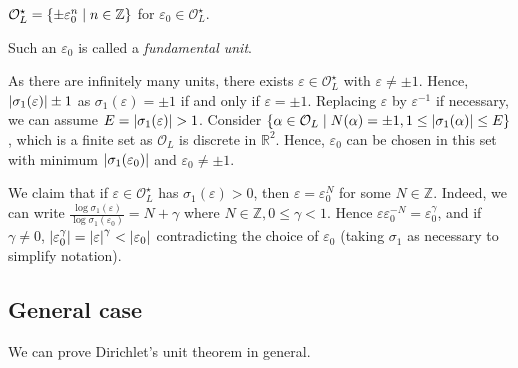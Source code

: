 \begin{corollary}
    \( \mathcal O_L^\star = \qty{\pm \varepsilon_0^n \mid n \in \mathbb Z} \) for \( \varepsilon_0 \in \mathcal O_L^\star \).
\end{corollary}
Such an \( \varepsilon_0 \) is called a \emph{fundamental unit}.
\begin{remark}
    As there are infinitely many units, there exists \( \varepsilon \in \mathcal O_L^\star \) with \( \varepsilon \neq \pm 1 \).
    Hence, \( \abs{\sigma_1(\varepsilon)} \pm 1 \) as \( \sigma_1(\varepsilon) = \pm 1 \) if and only if \( \varepsilon = \pm 1 \).
    Replacing \( \varepsilon \) by \( \varepsilon^{-1} \) if necessary, we can assume \( E = \abs{\sigma_1(\varepsilon)} > 1 \).
    Consider \( \qty{\alpha \in \mathcal O_L \mid N(\alpha) = \pm 1, 1 \leq \abs{\sigma_1(\alpha)} \leq E} \), which is a finite set as \( \mathcal O_L \) is discrete in \( \mathbb R^2 \).
    Hence, \( \varepsilon_0 \) can be chosen in this set with minimum \( \abs{\sigma_1(\varepsilon_0)} \) and \( \varepsilon_0 \neq \pm 1 \).

    We claim that if \( \varepsilon \in \mathcal O_L^\star \) has \( \sigma_1(\varepsilon) > 0 \), then \( \varepsilon = \varepsilon_0^N \) for some \( N \in \mathbb Z \).
    Indeed, we can write \( \frac{\log \sigma_1(\varepsilon)}{\log \sigma_1(\varepsilon_0)} = N + \gamma \) where \( N \in \mathbb Z, 0 \leq \gamma < 1 \).
    Hence \( \varepsilon \varepsilon_0^{-N} = \varepsilon_0^\gamma \), and if \( \gamma \neq 0 \), \( \abs{\varepsilon_0^\gamma} = \abs{\varepsilon}^\gamma < \abs{\varepsilon_0} \) contradicting the choice of \( \varepsilon_0 \) (taking \( \sigma_1 \) as necessary to simplify notation).
\end{remark}

\subsection{General case}
We can prove Dirichlet's unit theorem in general.

